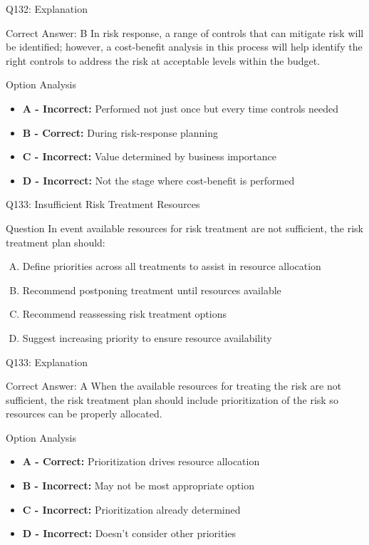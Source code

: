 \documentclass{beamer}
\begin{document}
	\begin{frame}{Q132: Explanation}
		\begin{block}{Correct Answer: B}
			In risk response, a range of controls that can mitigate risk will be identified; however, a cost-benefit analysis in this process will help identify the right controls to address the risk at acceptable levels within the budget.
		\end{block}
		\begin{block}{Option Analysis}
			\begin{itemize}
				\item \textbf{A - Incorrect:} Performed not just once but every time controls needed
				\item \textbf{B - Correct:} During risk-response planning
				\item \textbf{C - Incorrect:} Value determined by business importance
				\item \textbf{D - Incorrect:} Not the stage where cost-benefit is performed
			\end{itemize}
		\end{block}
	\end{frame}
	
	\begin{frame}{Q133: Insufficient Risk Treatment Resources}
		\begin{block}{Question}
			In event available resources for risk treatment are not sufficient, the risk treatment plan should:
		\end{block}
		\begin{enumerate}[(A)]
			\item Define priorities across all treatments to assist in resource allocation
			\item Recommend postponing treatment until resources available
			\item Recommend reassessing risk treatment options
			\item Suggest increasing priority to ensure resource availability
		\end{enumerate}
	\end{frame}
	
	\begin{frame}{Q133: Explanation}
		\begin{block}{Correct Answer: A}
			When the available resources for treating the risk are not sufficient, the risk treatment plan should include prioritization of the risk so resources can be properly allocated.
		\end{block}
		\begin{block}{Option Analysis}
			\begin{itemize}
				\item \textbf{A - Correct:} Prioritization drives resource allocation
				\item \textbf{B - Incorrect:} May not be most appropriate option
				\item \textbf{C - Incorrect:} Prioritization already determined
				\item \textbf{D - Incorrect:} Doesn't consider other priorities
			\end{itemize}
		\end{block}
	\end{frame}
	
\end{document}
